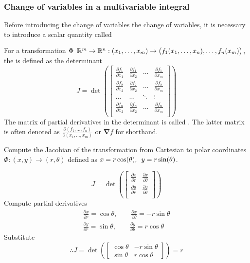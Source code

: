 \documentclass[a4paper]{article}
\begin{document}
\subsubsection{Change of variables in a multivariable integral}

Before introducing the change of variables the change of variables, it is necessary to introduce a scalar quantity called 
\begin{definition}[Jacobian]
	For a transformation $\Phi \enskip \mathbb{R}^m \rightarrow \mathbb{R}^n : (x_1,\ldots,x_m) \rightarrow \big(f_1(x_1,\ldots,x_n),\ldots,f_n(x_m)\big)$, the  is defined as the determinant
	\[
		J = \det\left(
			\begin{bmatrix}
				\frac{\partial f_1}{\partial x_1} & \frac{\partial f_1}{\partial x_2} & \ldots & \frac{\partial f_1}{\partial x_m} \\
				\frac{\partial f_2}{\partial x_2} & \frac{\partial f_2}{\partial x_2} &\ldots & \frac{\partial f_2}{\partial x_m} \\
				\ldots & \ldots & \ddots & \vdots \\
				\frac{\partial f_n}{\partial x_2} & \frac{\partial f_n}{\partial x_2} & \ldots & \frac{\partial f_n}{\partial x_m} \\
			\end{bmatrix}
		\right)	
	\]
	The matrix of partial derivatives in the determinant is called . The latter matrix is often denoted as $\frac{\partial(f_1,\ldots,f_n)}{\partial(x_1,\ldots,x_m)}$ or $\boldsymbol{\nabla} f$ for shorthand.


\end{definition}
\begin{exmp}	
	Compute the Jacobian of the transformation from Cartesian to polar coordinates $\Phi: (x,y)\rightarrow (r,\theta)$ defined as $x=r\cos(\theta),\enskip y=r\sin(\theta)$.
\end{exmp}
\begin{soln}
	\[
		J = \det\left(
			\begin{bmatrix}
				\frac{\partial x}{ \partial r} 	 & \frac{\partial x}{\partial \theta} \\ 
				\frac{\partial y}{ \partial r} 	 & \frac{\partial y}{\partial \theta} \\ 
			\end{bmatrix}
		\right)
	\]
Compute partial derivatives
	\begin{gather*}
		\frac{\partial x}{\partial r} = \cos\theta, \qquad \frac{\partial x}{\partial \theta} = -r\sin\theta\\
		\frac{\partial y}{\partial r} = \sin\theta, \qquad \frac{\partial y}{\partial \theta} = r\cos\theta
	\end{gather*}
	Substitute
	\[
		\therefore J = 	\det\left(
			\begin{bmatrix}
				\cos\theta & -r\sin\theta\\
				\sin\theta & r\cos\theta
			\end{bmatrix} 
		\right) = r
	\]
\end{soln}
\end{document}
